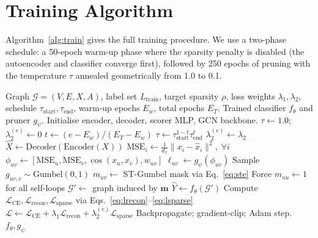 \documentclass[11pt,a4paper]{report}
\theoremstyle{definition}
\theoremstyle{remark}
\begin{document}
\section{Training Algorithm}

Algorithm~\ref{alg:train} gives the full training procedure. We use a
two-phase schedule: a 50-epoch warm-up phase where the sparsity penalty
is disabled (the autoencoder and classifier converge first), followed
by 250 epochs of pruning with the temperature $\tau$ annealed
geometrically from 1.0 to 0.1.

\begin{algorithm}[h]
\caption{Self-Supervised Reconstruction-Guided Edge Pruning}
\label{alg:train}
\begin{algorithmic}[1]
\Require Graph $\mathcal{G}=(V,E,X,A)$, label set $L_{\text{train}}$,
target sparsity $\rho$, loss weights $\lambda_1, \lambda_2$, schedule
$\tau_{\text{start}}, \tau_{\text{end}}$, warm-up epochs $E_w$, total
epochs $E_T$.
\Ensure Trained classifier $f_\theta$ and pruner $g_\psi$.
\State Initialise encoder, decoder, scorer MLP, GCN backbone.
       \State $\tau \gets 1.0$;\quad $\lambda_2^{(e)} \gets 0$
   \Else
       \State $t \gets (e-E_w)/(E_T-E_w)$
       \State $\tau \gets \tau_{\text{start}}^{1-t} \tau_{\text{end}}^{t}$
       \State $\lambda_2^{(e)} \gets \lambda_2$
   \EndIf
   \State $\hat{X} \gets \text{Decoder}(\text{Encoder}(X))$
   \State $\mathrm{MSE}_i \gets \frac{1}{d_x}\|x_i-\hat{x}_i\|^2,\;\forall i$
       \State $\phi_{uv} \gets [\mathrm{MSE}_u,\mathrm{MSE}_v,\cos(x_u,x_v),w_{uv}]$
       \State $\ell_{uv} \gets g_\psi(\phi_{uv})$
       \State Sample $g_{uv,c}\sim\text{Gumbel}(0,1)$
       \State $m_{uv} \gets$ ST-Gumbel mask via Eq.~\eqref{eq:ste}
   \EndFor
   \State Force $m_{uu} \gets 1$ for all self-loops
   \State $\mathcal{G}' \gets$ graph induced by $\bm{m}$
   \State $\hat{Y} \gets f_\theta(\mathcal{G}')$
   \State Compute $\mathcal{L}_{\text{CE}}, \mathcal{L}_{\text{recon}},
                  \mathcal{L}_{\text{sparse}}$ via
                  Eqs.~\eqref{eq:lrecon}--\eqref{eq:lsparse}
   \State $\mathcal{L} \gets \mathcal{L}_{\text{CE}}
                          + \lambda_1\mathcal{L}_{\text{recon}}
                          + \lambda_2^{(e)}\mathcal{L}_{\text{sparse}}$
   \State Backpropagate; gradient-clip; Adam step.
\EndFor
\State \Return $f_\theta, g_\psi$
\end{algorithmic}
\end{algorithm}
\end{document}

